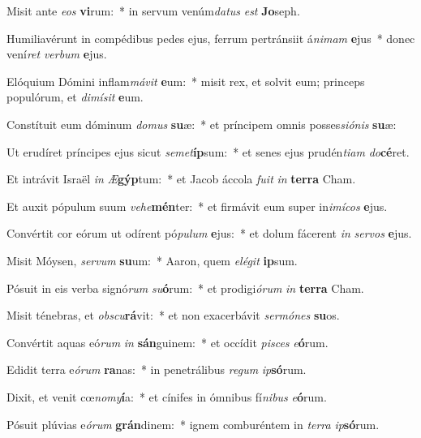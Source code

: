 \item Misit ante \textit{e}\textit{os} \textbf{vi}rum:~* in servum venúm\textit{da}\textit{tus} \textit{est} \textbf{Jo}seph.
\item Humiliavérunt in compédibus pedes ejus, ferrum pertránsiit á\textit{ni}\textit{mam} \textbf{e}jus~* donec vení\textit{ret} \textit{ver}\textit{bum} \textbf{e}jus.
\item Elóquium Dómini inflam\textit{má}\textit{vit} \textbf{e}um:~* misit rex, et solvit eum; princeps populórum, et \textit{di}\textit{mí}\textit{sit} \textbf{e}um.
\item Constítuit eum dóminum \textit{do}\textit{mus} \textbf{su}æ:~* et príncipem omnis posses\textit{si}\textit{ó}\textit{nis} \textbf{su}æ:
\item Ut erudíret príncipes ejus sicut \textit{se}\textit{met}\textbf{íp}sum:~* et senes ejus prudén\textit{ti}\textit{am} \textit{do}\textbf{cé}ret.
\item Et intrávit Israël \textit{in} \textit{Æ}\textbf{gýp}tum:~* et Jacob áccola \textit{fu}\textit{it} \textit{in} \textbf{ter}\textbf{ra} Cham.
\item Et auxit pópulum suum \textit{ve}\textit{he}\textbf{mén}ter:~* et firmávit eum super in\textit{i}\textit{mí}\textit{cos} \textbf{e}jus.
\item Convértit cor eórum ut odírent pó\textit{pu}\textit{lum} \textbf{e}jus:~* et dolum fácerent \textit{in} \textit{ser}\textit{vos} \textbf{e}jus.
\item Misit Móysen, \textit{ser}\textit{vum} \textbf{su}um:~* Aaron, quem \textit{e}\textit{lé}\textit{git} \textbf{ip}sum.
\item Pósuit in eis verba signó\textit{rum} \textit{su}\textbf{ó}rum:~* et prodigi\textit{ó}\textit{rum} \textit{in} \textbf{ter}\textbf{ra} Cham.
\item Misit ténebras, et \textit{obs}\textit{cu}\textbf{rá}vit:~* et non exacerbávit \textit{ser}\textit{mó}\textit{nes} \textbf{su}os.
\item Convértit aquas eó\textit{rum} \textit{in} \textbf{sán}guinem:~* et occídit \textit{pi}\textit{sces} \textit{e}\textbf{ó}rum.
\item Edidit terra e\textit{ó}\textit{rum} \textbf{ra}nas:~* in penetrálibus \textit{re}\textit{gum} \textit{ip}\textbf{só}rum.
\item Dixit, et venit cœ\textit{no}\textit{my}\textbf{í}a:~* et cínifes in ómnibus fí\textit{ni}\textit{bus} \textit{e}\textbf{ó}rum.
\item Pósuit plúvias e\textit{ó}\textit{rum} \textbf{grán}dinem:~* ignem comburéntem in \textit{ter}\textit{ra} \textit{ip}\textbf{só}rum.
